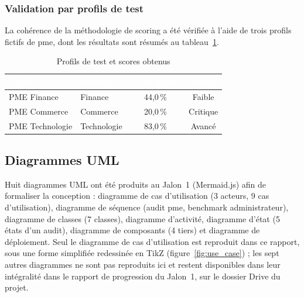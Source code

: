\subsubsection{Validation par profils de test}

La cohérence de la méthodologie de scoring a été vérifiée à l'aide de trois profils fictifs de \gls{pme}, dont les résultats sont résumés au tableau~\ref{tab:profils}.

\begin{table}[H]
  \centering
  \caption{Profils de test et scores obtenus}
  \label{tab:profils}
  \renewcommand{\arraystretch}{1.3}
  \begin{tabular}{|l|l|c|c|}
    \hline
    \rowcolor{iacsTableHead}
    \textcolor{white}{\textbf{Profil}} &
    \textcolor{white}{\textbf{Secteur}} &
    \textcolor{white}{\textbf{Score global}} &
    \textcolor{white}{\textbf{Niveau}} \\
    \hline
    PME Finance & Finance & 44,0\,\% & Faible \\
    \hline
    \rowcolor{iacsLightGray}
    PME Commerce & Commerce & 20,0\,\% & Critique \\
    \hline
    PME Technologie & Technologie & 83,0\,\% & Avancé \\
    \hline
  \end{tabular}
\end{table}


\subsection{Diagrammes UML}

Huit diagrammes UML ont été produits au Jalon~1 (Mermaid.js) afin de formaliser la conception : diagramme de cas d'utilisation (3 acteurs, 9 cas d'utilisation), diagramme de séquence (audit \gls{pme}, benchmark administrateur), diagramme de classes (7 classes), diagramme d'activité, diagramme d'état (5 états d'un audit), diagramme de composants (4 tiers) et diagramme de déploiement. Seul le diagramme de cas d'utilisation est reproduit dans ce rapport, sous une forme simplifiée redessinée en TikZ (figure~\ref{fig:use_case}) ; les sept autres diagrammes ne sont pas reproduits ici et restent disponibles dans leur intégralité dans le rapport de progression du Jalon~1, sur le dossier Drive du projet.


